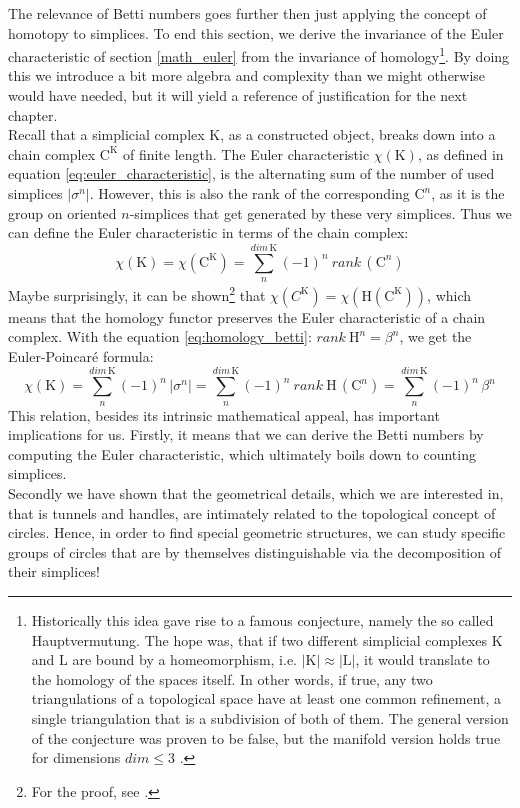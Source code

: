The relevance of Betti numbers goes further then just applying the concept of homotopy to simplices.
To end this section, we derive the invariance of the Euler characteristic of section \ref{math_euler} from the invariance of homology\footnote{ Historically this idea gave rise to a famous conjecture, namely the so called Hauptvermutung. The hope was, that if two different simplicial complexes $\mathrm{K}$ and $\mathrm{L}$ are bound by a homeomorphism, i.e. $|\mathrm{K}| \approx |\mathrm{L}|$, it would translate to the homology of the spaces itself. In other words, if true, any two triangulations of a topological space have at least one common refinement, a single triangulation that is a subdivision of both of them. The general version of the conjecture was proven to be false, but the manifold version holds true for dimensions $dim \leq 3$ \citep[for an extensive discussion, see:][]{Ranicki1996}.}.
By doing this we introduce a bit more algebra and complexity than we might otherwise would have needed, but it will yield a reference of justification for the next chapter.\\
Recall that a simplicial complex $\mathrm{K}$, as a constructed object, breaks down into a chain complex $\mathrm{C}^{\mathrm{K}}$ of finite length.
The Euler characteristic $\chi(\mathrm{K})$, as defined in equation \eqref{eq:euler_characteristic}, is the alternating sum of the number of used simplices $|\sigma^{n}|$.
However, this is also the rank of the corresponding $\mathrm{C}^{n}$, as it is the group on oriented $n$-simplices that get generated by these very simplices.
Thus we can define the Euler characteristic in terms of the chain complex:
\begin{equation}
	\chi(\mathrm{K}) = \chi(\mathrm{C}^{\mathrm{K}}) = \sum_{n}^{dim\, \mathrm{K}} (-1)^{n}~ rank \,(\mathrm{C}^{n})
\end{equation}  
Maybe surprisingly, it can be shown\footnote{ For the proof, see \citep[][pp.155-156]{Hatcher2002}.} that $\chi(C^{\mathrm{K}}) = \chi(\mathrm{\mathrm{H}}(\mathrm{C}^{\mathrm{K}}))$, which means that the homology functor preserves the Euler characteristic of a chain complex.
With the equation \eqref{eq:homology_betti}: $rank ~\mathrm{H}^{n} = \beta^{n}$, we get the Euler-Poincaré formula:
\begin{equation} \label{eq:euler_poincare}
	\chi(\mathrm{K}) = \sum_{n}^{dim \, \mathrm{K}} (-1)^{n} \,|\sigma^{n}| =
	\sum_{n}^{dim\, \mathrm{K}} (-1)^{n}~ rank ~\mathrm{H}\,(\mathrm{C}^{n}) =
	\sum_{n}^{dim \, \mathrm{K}} (-1)^{n}\, \beta^{n}
\end{equation}
This relation, besides its intrinsic mathematical appeal, has important implications for us.
Firstly, it means that we can derive the Betti numbers by computing the Euler characteristic, which ultimately boils down to counting simplices.\\
Secondly we have shown that the geometrical details, which we are interested in, that is tunnels and handles, are intimately related to the topological concept of circles.
Hence, in order to find special geometric structures, we can study specific groups of circles that are by themselves distinguishable via the decomposition of their simplices!

